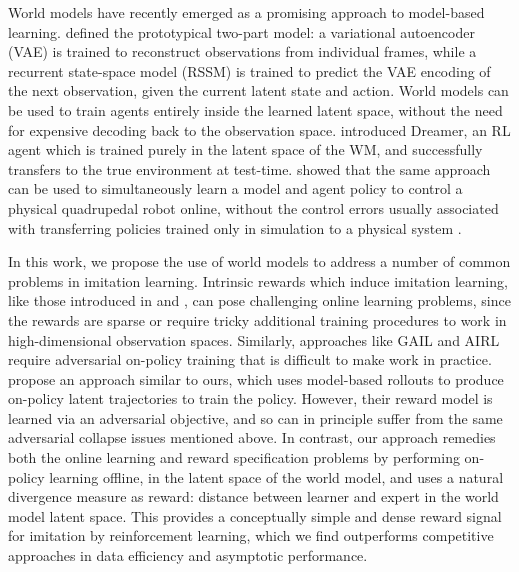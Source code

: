 \documentclass[10pt]{article} %
\theoremstyle{plain}
\theoremstyle{definition}
\theoremstyle{remark}
\begin{document}
World models have recently emerged as a promising approach to model-based learning. \citet{worldmodels} defined the prototypical two-part model: a variational autoencoder (VAE) is trained to reconstruct observations from individual frames, while a recurrent state-space model (RSSM) is trained to predict the VAE encoding of the next observation, given the current latent state and action. World models can be used to train agents entirely inside the learned latent space, without the need for expensive decoding back to the observation space. \citet{dreamer} introduced Dreamer, an RL agent which is trained purely in the latent space of the WM, and successfully transfers to the true environment at test-time. \citet{DayDreamer} showed that the same approach can be used to simultaneously learn a model and agent policy to control a physical quadrupedal robot online, without the control errors usually associated with transferring policies trained only in simulation to a physical system \citep{actuatornet}.

In this work, we propose the use of world models to address a number of common problems in imitation learning. Intrinsic rewards which induce imitation learning, like those introduced in \citet{sqil} and \citet{randomexpert}, can pose challenging online learning problems, since the rewards are sparse or require tricky additional training procedures to work in high-dimensional observation spaces. Similarly, approaches like GAIL \citep{GAIL} and AIRL \citep{AIRL} require adversarial on-policy training that is difficult to make work in practice. \cite{vmail} propose an approach similar to ours, which uses model-based rollouts to produce on-policy latent trajectories to train the policy. However, their reward model is learned via an adversarial objective, and so can in principle suffer from the same adversarial collapse issues mentioned above. In contrast, our approach remedies both the online learning and reward specification problems by performing on-policy learning offline, in the latent space of the world model, and uses a natural divergence measure as reward: distance between learner and expert in the world model latent space. This provides a conceptually simple and dense reward signal for imitation by reinforcement learning, which we find outperforms competitive approaches in data efficiency and asymptotic performance.
\end{document}
